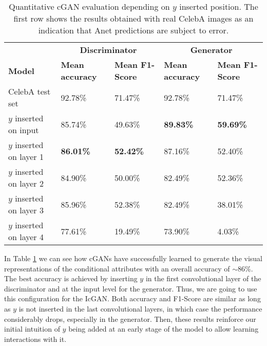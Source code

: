 \documentclass{article}
\begin{document}
\begin{table}[ht]
\centering
\caption{Quantitative cGAN evaluation depending on $y$ inserted position. The first row shows the results obtained with real CelebA images as an indication that Anet predictions are subject to error.}
\label{tab:cGAN_quantEval}
\begin{adjustbox}{width=0.80\textwidth}
\begin{tabular}{lllll}
                        & \multicolumn{2}{c}{\textbf{Discriminator}}                           & \multicolumn{2}{c}{\textbf{Generator}}          \\
\textbf{Model}          & \textbf{Mean accuracy} & \multicolumn{1}{l|}{\textbf{Mean F1-Score}} & \textbf{Mean accuracy} & \textbf{Mean F1-Score} \\
CelebA test set         & 92.78\%                & \multicolumn{1}{l|}{71.47\%}                & 92.78\%                & 71.47\%                \\
$y$ inserted on input            & 85.74\%                & \multicolumn{1}{l|}{49.63\%}                & \textbf{89.83\%}       & \textbf{59.69\%}       \\
$y$ inserted on layer 1 & \textbf{86.01\%}       & \multicolumn{1}{l|}{\textbf{52.42\%}}       & 87.16\%                & 52.40\%                \\
$y$ inserted on layer 2 & 84.90\%                & \multicolumn{1}{l|}{50.00\%}                & 82.49\%                & 52.36\%                \\
$y$ inserted on layer 3 & 85.96\%                & \multicolumn{1}{l|}{52.38\%}                & 82.49\%                & 38.01\%                \\
$y$ inserted on layer 4 & 77.61\%                & \multicolumn{1}{l|}{19.49\%}                & 73.90\%                & 4.03\%                
\end{tabular}
\end{adjustbox}
\end{table}

In Table \ref{tab:cGAN_quantEval} we can see how cGANs have successfully learned to generate the visual representations of the conditional attributes with an overall accuracy of $\sim86$\%. The best accuracy is achieved by inserting $y$ in the first convolutional layer of the discriminator and at the input level for the generator. Thus, we are going to use this configuration for the IcGAN. Both accuracy and F1-Score are similar as long as $y$ is not inserted in the last convolutional layers, in which case the performance considerably drops, especially in the generator. Then, these results reinforce our initial intuition of $y$ being added at an early stage of the model to allow learning interactions with it.
\end{document}
